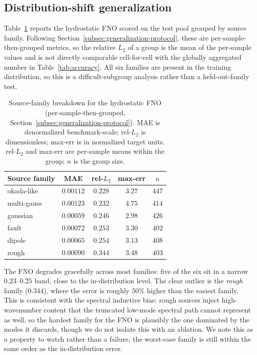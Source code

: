 \subsection{Distribution-shift generalization}
\label{subsec:res-ood}

Table~\ref{tab:ood} reports the hydrostatic FNO scored on the test pool grouped by source family. Following Section~\ref{subsec:generalization-protocol}, these are per-sample-then-grouped metrics, so the relative $L_2$ of a group is the mean of the per-sample values and is not directly comparable cell-for-cell with the globally aggregated number in Table~\ref{tab:accuracy}. All six families are present in the training distribution, so this is a difficult-subgroup analysis rather than a held-out-family test.

\begin{table}[!htbp]
\centering
\caption{Source-family breakdown for the hydrostatic FNO (per-sample-then-grouped, Section~\ref{subsec:generalization-protocol}). MAE is denormalized benchmark-scale; rel-$L_2$ is dimensionless; max-err is in normalized target units. rel-$L_2$ and max-err are per-sample means within the group; $n$ is the group size.}
\label{tab:ood}
\begin{tabular}{lcccc}
    \toprule
    Source family & MAE & rel-$L_2$ & max-err & $n$ \\
    \midrule
    okada-like  & $0.00112$ & $0.228$ & $3.27$ & $447$ \\
    multi-gauss & $0.00123$ & $0.232$ & $4.75$ & $414$ \\
    gaussian    & $0.00059$ & $0.246$ & $2.98$ & $426$ \\
    fault       & $0.00072$ & $0.253$ & $3.30$ & $402$ \\
    dipole      & $0.00065$ & $0.254$ & $3.13$ & $408$ \\
    rough       & $0.00090$ & $\mathbf{0.344}$ & $3.48$ & $403$ \\
    \bottomrule
\end{tabular}
\end{table}

The FNO degrades gracefully across most families: five of the six sit in a narrow $0.23$--$0.25$ band, close to the in-distribution level. The clear outlier is the \emph{rough} family ($0.344$), where the error is roughly $50\%$ higher than the easiest family. This is consistent with the spectral inductive bias: rough sources inject high-wavenumber content that the truncated low-mode spectral path cannot represent as well, so the hardest family for the FNO is plausibly the one dominated by the modes it discards, though we do not isolate this with an ablation. We note this as a property to watch rather than a failure, the worst-case family is still within the same order as the in-distribution error.

